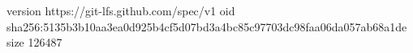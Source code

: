 version https://git-lfs.github.com/spec/v1
oid sha256:5135b3b10aa3ea0d925b4cf5d07bd3a4bc85c97703dc98faa06da057ab68a1de
size 126487
